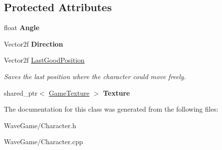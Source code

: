 \subsection*{Protected Attributes}
\begin{DoxyCompactItemize}
\item 
\mbox{\label{class_engine_1_1_core_1_1_character_ad98ac89b7c82b587306e83b5aa6acf07}} 
float {\bfseries Angle}
\item 
\mbox{\label{class_engine_1_1_core_1_1_character_aacac55c620345c41b3eb09f4abbd4318}} 
Vector2f {\bfseries Direction}
\item 
\mbox{\label{class_engine_1_1_core_1_1_character_ab749582f4376b908cdf23d6cc4ac2fe2}} 
Vector2f \hyperlink{class_engine_1_1_core_1_1_character_ab749582f4376b908cdf23d6cc4ac2fe2}{Last\+Good\+Position}
\begin{DoxyCompactList}\small\item\em Saves the last position where the character could move freely. \end{DoxyCompactList}\item 
\mbox{\label{class_engine_1_1_core_1_1_character_a289559b0eea38088ed1135ef8cf994dd}} 
shared\+\_\+ptr$<$ \hyperlink{class_engine_1_1_core_1_1_game_texture}{Game\+Texture} $>$ {\bfseries Texture}
\end{DoxyCompactItemize}


The documentation for this class was generated from the following files\+:\begin{DoxyCompactItemize}
\item 
Wave\+Game/Character.\+h\item 
Wave\+Game/Character.\+cpp\end{DoxyCompactItemize}
